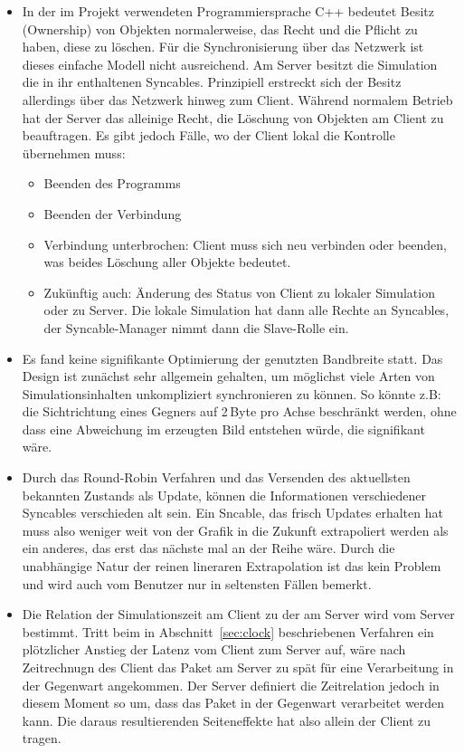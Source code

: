 \begin{itemize}
\item In der im Projekt verwendeten Programmiersprache C++ bedeutet Besitz (Ownership) von Objekten normalerweise, das Recht und die Pflicht zu haben, diese zu löschen. Für die Synchronisierung über das Netzwerk ist dieses einfache Modell nicht ausreichend. Am Server besitzt die Simulation die in ihr enthaltenen Syncables. Prinzipiell erstreckt sich der Besitz allerdings über das Netzwerk hinweg zum Client. Während normalem Betrieb hat der Server das alleinige Recht, die Löschung von Objekten am Client zu beauftragen. Es gibt jedoch Fälle, wo der Client lokal die Kontrolle übernehmen muss:
\begin{itemize}
\item Beenden des Programms
\item Beenden der Verbindung
\item Verbindung unterbrochen: Client muss sich neu verbinden oder beenden, was beides Löschung aller Objekte bedeutet.
\item Zukünftig auch: Änderung des Status von Client zu lokaler Simulation oder zu Server. Die lokale Simulation hat dann alle Rechte an Syncables, der Syncable-Manager nimmt dann die Slave-Rolle ein.
\end{itemize}

\item Es fand keine signifikante Optimierung der genutzten Bandbreite statt. Das Design ist zunächst sehr allgemein gehalten, um möglichst viele Arten von Simulationsinhalten unkompliziert synchronieren zu können. So könnte z.B: die Sichtrichtung eines Gegners auf 2\,Byte pro Achse beschränkt werden, ohne dass eine Abweichung im erzeugten Bild entstehen würde, die signifikant wäre.

\item Durch das Round-Robin Verfahren und das Versenden des aktuellsten bekannten Zustands als Update, können die Informationen verschiedener Syncables verschieden alt sein. Ein Sncable, das frisch Updates erhalten hat muss also weniger weit von der Grafik in die Zukunft extrapoliert werden als ein anderes, das erst das nächste mal an der Reihe wäre. Durch die unabhängige Natur der reinen lineraren Extrapolation ist das kein Problem und wird auch vom Benutzer nur in seltensten Fällen bemerkt.

\item Die Relation der Simulationszeit am Client zu der am Server wird vom Server bestimmt. Tritt beim in Abschnitt~\ref{sec:clock} beschriebenen Verfahren ein plötzlicher Anstieg der Latenz vom Client zum Server auf, wäre nach Zeitrechnugn des Client das Paket am Server zu spät für eine Verarbeitung in der Gegenwart angekommen. Der Server definiert die Zeitrelation jedoch in diesem Moment so um, dass das Paket in der Gegenwart verarbeitet werden kann. Die daraus resultierenden Seiteneffekte hat also allein der Client zu tragen.%


\end{itemize}



